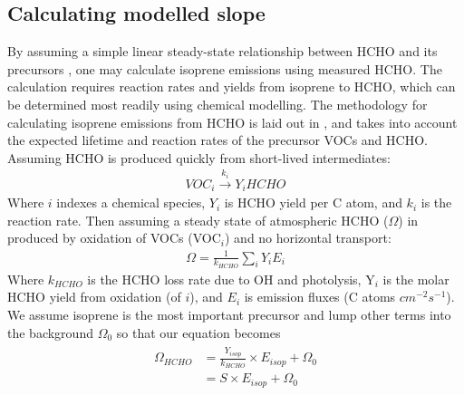     
  \subsection{Calculating modelled slope}
    \label{BioIsop:method:slope}
    
    By assuming a simple linear steady-state relationship between HCHO and its precursors \parencite{Palmer2003, Palmer2006, Millet2006}, one may calculate isoprene emissions using measured HCHO.
    The calculation requires reaction rates and yields from isoprene to HCHO, which can be determined most readily using chemical modelling.
    The methodology for calculating isoprene emissions from HCHO is laid out in \textcite{Palmer2003}, and takes into account the expected lifetime and reaction rates of the precursor VOCs and HCHO.
    Assuming HCHO is produced quickly from short-lived intermediates:
    \begin{eqnarray*}
      VOC_i \overset{k_i}{\rightarrow} Y_i HCHO
    \end{eqnarray*}
    Where $i$ indexes a chemical species, $Y_i$ is HCHO yield per C atom, and $k_i$ is the reaction rate.
    Then assuming a steady state of atmospheric HCHO ($\Omega$) in \moleccm produced by oxidation of VOCs (VOC$_i$) and no horizontal transport:
    \begin{eqnarray*}
      \Omega = \frac{1}{k_{HCHO}} \sum_{i} Y_i E_i
    \end{eqnarray*}
    Where $k_{HCHO}$ is the HCHO loss rate due to OH and photolysis, Y$_i$ is the molar HCHO yield from oxidation (of $i$), and $E_i$ is emission fluxes (C atoms $cm^{-2} s^{-1}$).
    We assume isoprene is the most important precursor and lump other terms into the background $\Omega_0$ so that our equation becomes 
    \begin{eqnarray} 
    \label{BioIsop:method:slope:eqn_isop_to_hcho}
    \begin{split}
      \Omega_{HCHO} 
      &= \frac{Y_{isop}}{k_{HCHO}} \times E_{isop} + \Omega_0 \\
      & = S \times E_{isop} + \Omega_0
    \end{split} \end{eqnarray}
    
